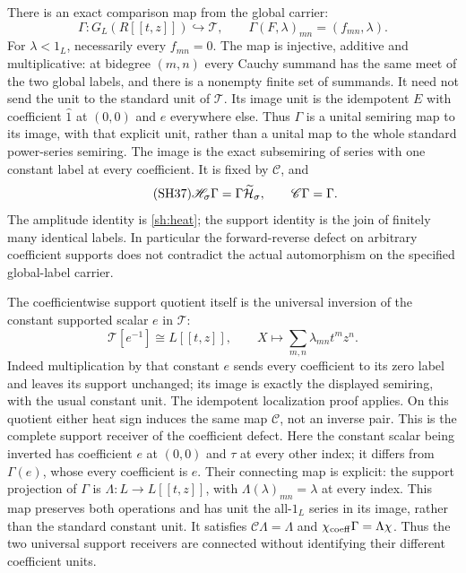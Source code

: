 There is an exact comparison map from the global carrier:
\begin{equation}\tag{SH36}\label{sh:uniformmap}
 \Gamma:G_L(R[[t,z]])\hookrightarrow\mathscr T,\qquad
 \Gamma(F,\lambda)_{mn}=(f_{mn},\lambda).
\end{equation}
For $\lambda<1_L$, necessarily every $f_{mn}=0$.
The map is injective, additive and multiplicative: at bidegree
$(m,n)$ every Cauchy summand has the same meet of the two
global labels, and there is a nonempty finite set of summands.
It need not send the unit to the standard unit of
$\mathscr T$. Its image unit is the idempotent $E$ with
coefficient $\widehat1$ at $(0,0)$ and $e$ everywhere else.
Thus $\Gamma$ is a unital semiring map to its image, with that
explicit unit, rather than a unital map to the whole standard
power-series semiring. The image is the exact subsemiring of
series with one constant label at every coefficient.
It is fixed by $\mathscr C$, and
\begin{equation}\tag{SH37}\label{sh:uniformheat}
 \mathscr H_\sigma\Gamma=
       \Gamma\widetilde{\mathcal H}_\sigma,\qquad
 \mathscr C\Gamma=\Gamma .
\end{equation}
The amplitude identity is \eqref{sh:heat}; the support identity
is the join of finitely many identical labels. In particular
the forward-reverse defect on arbitrary coefficient supports
does not contradict the actual automorphism on the specified
global-label carrier.

The coefficientwise support quotient itself is the universal
inversion of the constant supported scalar $e$ in $\mathscr T$:
\begin{equation}\tag{SH38}\label{sh:coefflocalize}
\mathscr T[e^{-1}]\cong L[[t,z]],\qquad
 X\longmapsto\sum_{m,n}\lambda_{mn}t^mz^n .
\end{equation}
Indeed multiplication by that constant $e$ sends every
coefficient to its zero label and leaves its support unchanged;
its image is exactly the displayed semiring, with the usual
constant unit. The idempotent localization proof applies.
On this quotient either heat sign induces the same map
$\mathcal C$, not an inverse pair. This is the complete
support receiver of the coefficient defect.
Here the constant scalar being inverted has coefficient $e$
at $(0,0)$ and $\tau$ at every other index; it differs from
$\Gamma(e)$, whose every coefficient is $e$. Their connecting
map is explicit: the support projection of $\Gamma$ is
$\Lambda:L\to L[[t,z]]$, with
$\Lambda(\lambda)_{mn}=\lambda$ at every index. This map
preserves both operations and has unit the all-$1_L$ series
in its image, rather than the standard constant unit.
It satisfies $\mathcal C\Lambda=\Lambda$ and
$\chi_{\rm coeff}\Gamma=\Lambda\chi$.
Thus the two universal support receivers are connected without
identifying their different coefficient units.

